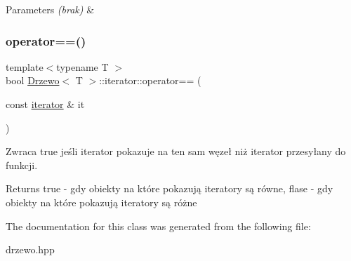 \begin{DoxyParams}{Parameters}
{\em (brak)} & \\
\hline
\end{DoxyParams}
\mbox{\label{class_drzewo_1_1iterator_a552c4e6d4bb62519595329bc5cf32d98}} 
\subsubsection{\texorpdfstring{operator==()}{operator==()}}
{\footnotesize\ttfamily template$<$typename T $>$ \\
bool \hyperlink{class_drzewo}{Drzewo}$<$ T $>$\+::iterator\+::operator== (\begin{DoxyParamCaption}\item[{const \hyperlink{class_drzewo_1_1iterator}{iterator} \&}]{it }\end{DoxyParamCaption})\hspace{0.3cm}{\ttfamily [inline]}}

Zwraca \textquotesingle{}true\textquotesingle{} jeśli iterator pokazuje na ten sam węzeł niż iterator przesyłany do funkcji.

\begin{DoxyReturn}{Returns}
true -\/ gdy obiekty na które pokazują iteratory są równe, flase -\/ gdy obiekty na które pokazują iteratory są różne 
\end{DoxyReturn}


The documentation for this class was generated from the following file\+:\begin{DoxyCompactItemize}
\item 
drzewo.\+hpp\end{DoxyCompactItemize}

